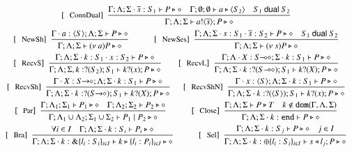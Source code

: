 \begin{figure}[!t]
\[\begin{array}{c}
		\trule{ConnDual}~~\tree{
			\Gamma; \Lambda; \Sigma \cat \dual{s}: S_1 \proves P \hastype \Proc  \quad \Gamma; \emptyset; \emptyset \proves a \hastype \chtype{S_2} \quad S_1 \dualof S_2
		}{
			\Gamma; \Lambda; \Sigma  \proves \bout{a}{\dual{s}} P \hastype \Proc
		}

		\\[4mm]

		\trule{NewSh}~~\tree{
			\Gamma\cat a:\chtype{S} ; \Lambda; \Sigma \proves P \hastype \Proc
		}{
			\Gamma; \Lambda; \Sigma \proves \news{a} P \hastype \Proc}
		\qquad\quad
		\trule{NewSes}~~\tree{
			\Gamma; \Lambda; \Sigma \cat s:S_1 \cat \dual{s}: S_2 \proves P \hastype \Proc \quad S_1 \dualof S_2
		}{
			\Gamma; \Lambda; \Sigma \proves \news{s} P \hastype \Proc
		}
		\\[4mm]

		\trule{RecvS}~~\tree{
			\Gamma; \Lambda; \Sigma \cat k: S_1 \cat x: S_2 \proves P \hastype \Proc
		}{
			\Gamma; \Lambda; \Sigma, k: \btinp{S_2} S_1  \vdash \binp{k}{x}P \hastype \Proc
		}
		\quad\quad 
		\trule{RecvL}~~\tree{
			\Gamma; \Lambda \cat X: \lhot{S}; \Sigma \cat k: S_1  \proves P \hastype \Proc
		}{
			\Gamma; \Lambda; \Sigma \cat k:\btinp{\lhot{S}}S_1  \proves \binp{k}{X}P \hastype \Proc
		}
		\\[4mm]

		\trule{RecvSh}~~\tree{
			\Gamma \cat X: \shot{S}; \Lambda; \Sigma \cat k: S_1  \proves P \hastype \Proc
		}{
			\Gamma; \Lambda; \Sigma \cat k:\btinp{\shot{S}}S_1  \proves \binp{k}{X}P \hastype \Proc
		}
		\quad ~~
		\trule{RecvShN}~~\tree{
			\Gamma \cat x: \chtype{S}; \Lambda; \Sigma \cat k: S_1  \proves P \hastype \Proc
		}{
			\Gamma; \Lambda; \Sigma \cat k:\btinp{\chtype{S}}S_1  \proves \binp{k}{x}P \hastype \Proc
		}
		\\[4mm]
		\trule{Par}~~\tree{
			\Gamma; \Lambda_{1}; \Sigma_{1} \proves P_{1} \hastype \Proc \quad \Gamma; \Lambda_{2}; \Sigma_{2} \proves P_{2} \hastype \Proc
		}{
			\Gamma; \Lambda_{1} \cup \Lambda_2; \Sigma_{1} \cup \Sigma_2 \proves P_1 \Par P_2 \hastype \Proc
		}
		\qquad\quad
		\trule{Close}~~\tree{
			\Gamma; \Lambda; \Sigma  \proves P \hastype T \quad k \not\in \dom{\Gamma, \Lambda,\Sigma}
		}{
			\Gamma; \Lambda; \Sigma \cat k: \tinact  \proves P \hastype \Proc
		}
		\\[4mm]
		\trule{Bra}~~\tree{
			 \forall i \in I \quad \Gamma; \Lambda; \Sigma \cat k:S_i \proves P_i \hastype \Proc
		}{
			\Gamma; \Lambda; \Sigma \cat k: \btbra{l_i:S_i}_{i \in I} \proves \bbra{k}{l_i:P_i}_{i \in I}\hastype \Proc
		}
		\qquad\quad 
	 	\trule{Sel}~~\tree{
			\Gamma; \Lambda; \Sigma \cat k: S_j  \proves P \hastype \Proc \quad j \in I
		}{
			\Gamma; \Lambda; \Sigma \cat k:\btsel{l_i:S_i}_{i \in I} \proves \bsel{s}{l_j} P \hastype \Proc
		}
		\\[4mm]


\end{array}\]
\end{figure}
